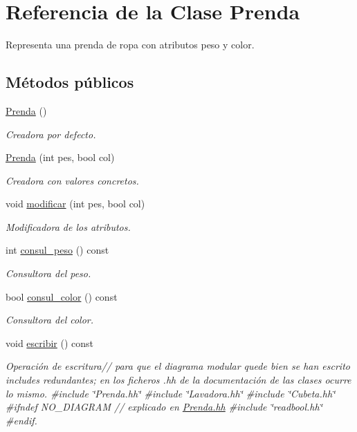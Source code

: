 \hypertarget{class_prenda}{}\section{Referencia de la Clase Prenda}
\label{class_prenda}


Representa una prenda de ropa con atributos peso y color.  


\subsection*{Métodos públicos}
\begin{DoxyCompactItemize}
\item 
\hyperlink{class_prenda_adfd86b131c7f40c58b0cb4200eb55129}{Prenda} ()
\begin{DoxyCompactList}\small\item\em Creadora por defecto. \end{DoxyCompactList}\item 
\hyperlink{class_prenda_af15ff723083040b89bc495b4ec4b914e}{Prenda} (int pes, bool col)
\begin{DoxyCompactList}\small\item\em Creadora con valores concretos. \end{DoxyCompactList}\item 
void \hyperlink{class_prenda_ab25b2a66034eb2c0fccfb1f3cedbb5a7}{modificar} (int pes, bool col)
\begin{DoxyCompactList}\small\item\em Modificadora de los atributos. \end{DoxyCompactList}\item 
int \hyperlink{class_prenda_ae886133326d46cc18dd9070d317a3ccb}{consul\+\_\+peso} () const 
\begin{DoxyCompactList}\small\item\em Consultora del peso. \end{DoxyCompactList}\item 
bool \hyperlink{class_prenda_a149632ba71127621c52917ef2e936c2e}{consul\+\_\+color} () const 
\begin{DoxyCompactList}\small\item\em Consultora del color. \end{DoxyCompactList}\item 
void \hyperlink{class_prenda_a3a5dfb75467c54157ec969b8ab7d752b}{escribir} () const 
\begin{DoxyCompactList}\small\item\em Operación de escritura// para que el diagrama modular quede bien se han escrito includes redundantes; en los ficheros .hh de la documentación de las clases ocurre lo mismo. \#include \char`\"{}\+Prenda.\+hh\char`\"{} \#include \char`\"{}\+Lavadora.\+hh\char`\"{} \#include \char`\"{}\+Cubeta.\+hh\char`\"{} \#ifndef N\+O\+\_\+\+D\+I\+A\+G\+R\+AM // explicado en \hyperlink{_prenda_8hh}{Prenda.\+hh} \#include \char`\"{}readbool.\+hh\char`\"{} \#endif. \end{DoxyCompactList}\end{DoxyCompactItemize}


